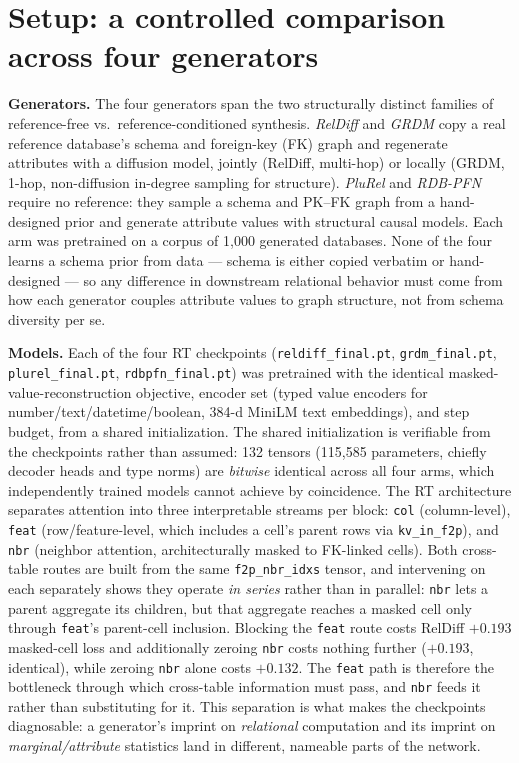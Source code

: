 \documentclass{article}
\begin{document}
\section{Setup: a controlled comparison across four generators}
\label{sec:setup}

\textbf{Generators.} The four generators span the two structurally distinct families of reference-free vs.\ reference-conditioned synthesis. \emph{RelDiff} \cite{reldiff} and \emph{GRDM} \cite{grdm} copy a real reference database's schema and foreign-key (FK) graph and regenerate attributes with a diffusion model, jointly (RelDiff, multi-hop) or locally (GRDM, 1-hop, non-diffusion in-degree sampling for structure). \emph{PluRel} \cite{plurel} and \emph{RDB-PFN} \cite{rdbpfn} require no reference: they sample a schema and PK--FK graph from a hand-designed prior and generate attribute values with structural causal models. Each arm was pretrained on a corpus of 1{,}000 generated databases. None of the four learns a schema prior from data --- schema is either copied verbatim or hand-designed --- so any difference in downstream relational behavior must come from how each generator couples attribute values to graph structure, not from schema diversity per se.

\textbf{Models.} Each of the four RT checkpoints (\texttt{reldiff\_final.pt}, \texttt{grdm\_final.pt}, \texttt{plurel\_final.pt}, \texttt{rdbpfn\_final.pt}) was pretrained with the identical masked-value-reconstruction objective, encoder set (typed value encoders for number/text/datetime/boolean, 384-d MiniLM \cite{minilm} text embeddings), and step budget, from a shared initialization. The shared initialization is verifiable from the checkpoints rather than assumed: 132 tensors (115{,}585 parameters, chiefly decoder heads and type norms) are \emph{bitwise} identical across all four arms, which independently trained models cannot achieve by coincidence. The RT architecture separates attention into three interpretable streams per block: \texttt{col} (column-level), \texttt{feat} (row/feature-level, which includes a cell's parent rows via \texttt{kv\_in\_f2p}), and \texttt{nbr} (neighbor attention, architecturally masked to FK-linked cells). Both cross-table routes are built from the same \texttt{f2p\_nbr\_idxs} tensor, and intervening on each separately shows they operate \emph{in series} rather than in parallel: \texttt{nbr} lets a parent aggregate its children, but that aggregate reaches a masked cell only through \texttt{feat}'s parent-cell inclusion. Blocking the \texttt{feat} route costs RelDiff $+0.193$ masked-cell loss and additionally zeroing \texttt{nbr} costs nothing further ($+0.193$, identical), while zeroing \texttt{nbr} alone costs $+0.132$. The \texttt{feat} path is therefore the bottleneck through which cross-table information must pass, and \texttt{nbr} feeds it rather than substituting for it. This separation is what makes the checkpoints diagnosable: a generator's imprint on \emph{relational} computation and its imprint on \emph{marginal/attribute} statistics land in different, nameable parts of the network.
\end{document}
